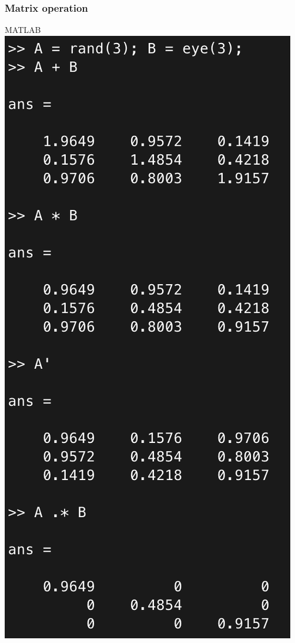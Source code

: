 \documentclass[compress]{beamer}
\begin{document}
\begin{frame}
	\frametitle{Matrix operation}
	\centering
	\begin{minipage}{0.35\textwidth}
		\centering
		MATLAB\\
		\includegraphics[width=\textwidth]{fig/matlab_mo}

\end{minipage}
\end{frame}
\end{document}
